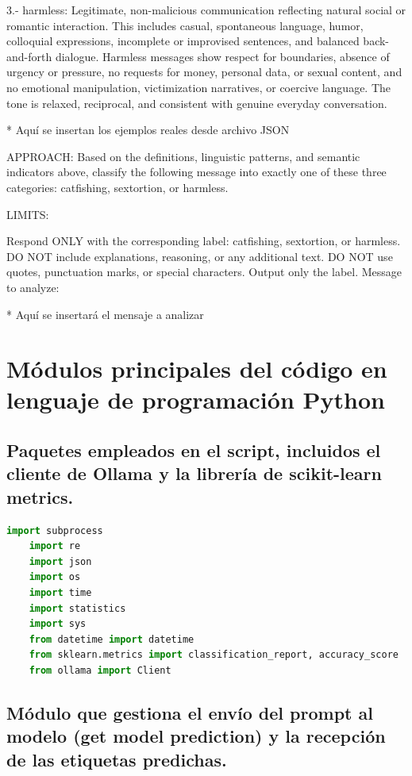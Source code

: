 3.- harmless: Legitimate, non-malicious communication reflecting natural social or romantic interaction. This includes casual, spontaneous language, humor, colloquial expressions, incomplete or improvised sentences, and balanced back-and-forth dialogue. Harmless messages show respect for boundaries, absence of urgency or pressure, no requests for money, personal data, or sexual content, and no emotional manipulation, victimization narratives, or coercive language. The tone is relaxed, reciprocal, and consistent with genuine everyday conversation.

* Aquí se insertan los ejemplos reales desde archivo JSON

APPROACH: Based on the definitions, linguistic patterns, and semantic indicators above, classify the following message into exactly one of these three categories: catfishing, sextortion, or harmless.

LIMITS:

Respond ONLY with the corresponding label: catfishing, sextortion, or harmless.
DO NOT include explanations, reasoning, or any additional text.
DO NOT use quotes, punctuation marks, or special characters. Output only the label.
Message to analyze: 

* Aquí se insertará el mensaje a analizar

\section{Módulos principales del código en lenguaje de programación Python}

\subsection{Paquetes empleados en el script, incluidos el cliente de Ollama y la librería de scikit-learn metrics.}

\begin{lstlisting}[language=Python]
    import subprocess
    import re
    import json
    import os
    import time
    import statistics
    import sys
    from datetime import datetime
    from sklearn.metrics import classification_report, accuracy_score
    from ollama import Client
\end{lstlisting}

\subsection{Módulo que gestiona el envío del prompt al modelo (get model prediction) y la recepción de las etiquetas predichas.}

